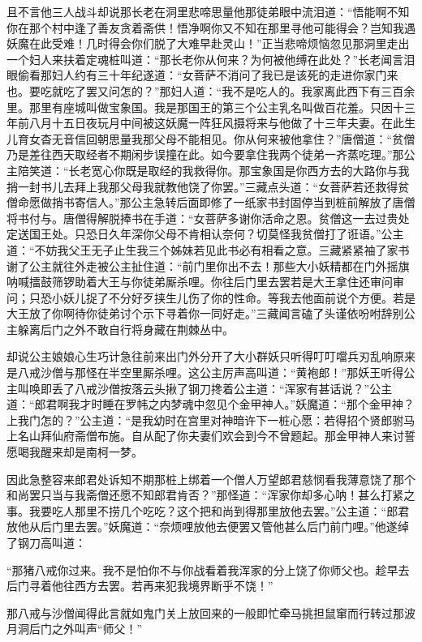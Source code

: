 \documentclass[12pt,UTF8]{ctexbook}
\begin{document}
且不言他三人战斗却说那长老在洞里悲啼思量他那徒弟眼中流泪道：“悟能啊不知你在那个村中逢了善友贪着斋供！悟净啊你又不知在那里寻他可能得会？岂知我遇妖魔在此受难！几时得会你们脱了大难早赴灵山！”正当悲啼烦恼忽见那洞里走出一个妇人来扶着定魂桩叫道：“那长老你从何来？为何被他缚在此处？”长老闻言泪眼偷看那妇人约有三十年纪遂道：“女菩萨不消问了我已是该死的走进你家门来也。要吃就吃了罢又问怎的？”那妇人道：“我不是吃人的。我家离此西下有三百余里。那里有座城叫做宝象国。我是那国王的第三个公主乳名叫做百花羞。只因十三年前八月十五日夜玩月中间被这妖魔一阵狂风摄将来与他做了十三年夫妻。在此生儿育女杳无音信回朝思量我那父母不能相见。你从何来被他拿住？”唐僧道：“贫僧乃是差往西天取经者不期闲步误撞在此。如今要拿住我两个徒弟一齐蒸吃理。”那公主陪笑道：“长老宽心你既是取经的我救得你。那宝象国是你西方去的大路你与我捎一封书儿去拜上我那父母我就教他饶了你罢。”三藏点头道：“女菩萨若还救得贫僧命愿做捎书寄信人。”那公主急转后面即修了一纸家书封固停当到桩前解放了唐僧将书付与。唐僧得解脱捧书在手道：“女菩萨多谢你活命之恩。贫僧这一去过贵处定送国王处。只恐日久年深你父母不肯相认奈何？切莫怪我贫僧打了诳语。”公主道：“不妨我父王无子止生我三个姊妹若见此书必有相看之意。三藏紧紧袖了家书谢了公主就往外走被公主扯住道：“前门里你出不去！那些大小妖精都在门外摇旗呐喊擂鼓筛锣助着大王与你徒弟厮杀哩。你往后门里去罢若是大王拿住还审问审问；只恐小妖儿捉了不分好歹挟生儿伤了你的性命。等我去他面前说个方便。若是大王放了你啊待你徒弟讨个示下寻着你一同好走。”三藏闻言磕了头谨依吩咐辞别公主躲离后门之外不敢自行将身藏在荆棘丛中。

却说公主娘娘心生巧计急往前来出门外分开了大小群妖只听得叮叮噹兵刃乱响原来是八戒沙僧与那怪在半空里厮杀哩。这公主厉声高叫道：“黄袍郎！”那妖王听得公主叫唤即丢了八戒沙僧按落云头揪了钢刀搀着公主道：“浑家有甚话说？”公主道：“郎君啊我才时睡在罗帏之内梦魂中忽见个金甲神人。”妖魔道：“那个金甲神？上我门怎的？”公主道：“是我幼时在宫里对神暗许下一桩心愿：若得招个贤郎驸马上名山拜仙府斋僧布施。自从配了你夫妻们欢会到今不曾题起。那金甲神人来讨誓愿喝我醒来却是南柯一梦。

因此急整容来郎君处诉知不期那桩上绑着一个僧人万望郎君慈悯看我薄意饶了那个和尚罢只当与我斋僧还愿不知郎君肯否？”那怪道：“浑家你却多心呐！甚么打紧之事。我要吃人那里不捞几个吃吃？这个把和尚到得那里放他去罢。”公主道：“郎君放他从后门里去罢。”妖魔道：“奈烦哩放他去便罢又管他甚么后门前门哩。”他遂绰了钢刀高叫道：

“那猪八戒你过来。我不是怕你不与你战看着我浑家的分上饶了你师父也。趁早去后门寻着他往西方去罢。若再来犯我境界断乎不饶！”

那八戒与沙僧闻得此言就如鬼门关上放回来的一般即忙牵马挑担鼠窜而行转过那波月洞后门之外叫声“师父！”
\end{document}
